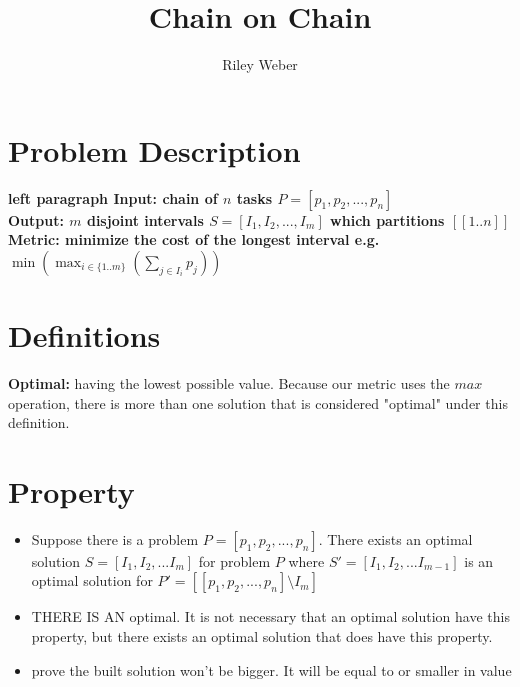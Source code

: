 \documentclass{article}
\author{Riley Weber}
\title{Chain on Chain}
\begin{document}
\maketitle

\section{Problem Description}

\begin{tabbing}
	\bfseries left \quad \quad \quad \=\bfseries paragraph \kill
	\textbf{Input:}  \> chain of $n$ tasks $P = [p_1, p_2, ..., p_n]$
	\\
	\textbf{Output:} \> $m$ disjoint intervals  $S = [I_1, I_2, ..., I_m]$ which
	partitions $[[1..n]]$ 
	\\
	\textbf{Metric:} \> minimize the cost of the longest interval e.g. 
	\\
	\>$\min(\max_{i\in\{1..m\}}(\sum_{j \in{I_i}} p_j))$ 
\end{tabbing}

\section{Definitions}
\textbf{Optimal:} having the lowest possible value. Because our metric uses the
$max$ operation, there is more than one solution that is considered "optimal"
under this definition.

\section{Property}
\begin{itemize}
\item Suppose there is a problem $P = [p_1, p_2, ..., p_n]$. There exists an
optimal solution $S = [I_1, I_2, ... I_m]$ for problem $P$ 
where $S' = [I_1, I_2, ... I_{m-1}]$ is an optimal solution for 
$P' = [[p_1, p_2, ..., p_n] \setminus I_m]$
\item THERE IS AN optimal. It is not necessary that an optimal solution have
this property, but there exists an optimal solution that does have this
property.
\item prove the built solution won't be bigger. It will be equal to or
smaller in value
\end{itemize}
\end{document}
